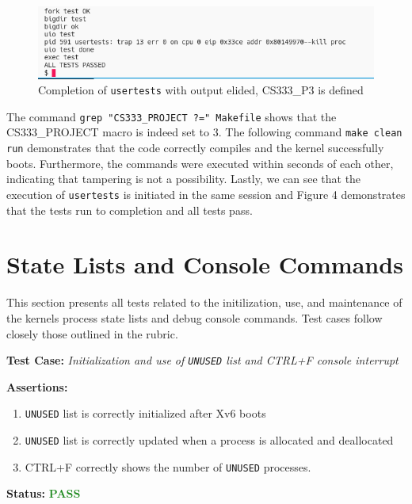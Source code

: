 \documentclass[11pt,letterpaper]{report}
\newcommand{\code}[1]{\colorbox{codegray}{\texttt{#1}}}
\begin{document}
{  \begin{figure}[h!]
	\centering
	\includegraphics[width=1\linewidth]{compilation2-usertests2.png}
	\caption[img]{Completion of \code{usertests} with output elided, CS333\_P3 is defined}
	\label{fig:P1compileP0-1}
  \end{figure}

  The command \code{grep "CS333\_PROJECT ?=" Makefile} shows that the CS333\_PROJECT macro
  is indeed set to 3. The following command \code{make clean run} demonstrates that the code
  correctly compiles and the kernel successfully boots. Furthermore, the commands were executed
  within seconds of each other, indicating that tampering is not a possibility. Lastly, we can
  see that the execution of \code{usertests} is initiated in the same session and Figure 4
  demonstrates that the tests run to completion and all tests pass. \\

  \pagebreak

  \section*{State Lists and Console Commands}
  This section presents all tests related to the initilization, use, and maintenance
  of the kernels process state lists and debug console commands. 
  Test cases follow closely those outlined in the rubric. \hfill \break
  
  \noindent\textbf{Test Case:} \emph{Initialization and use of \code{UNUSED} list and CTRL+F console interrupt}
  
  \noindent\textbf{Assertions:}
  \begin{enumerate}[]
  \item \code{UNUSED} list is correctly initialized after Xv6 boots
  \item \code{UNUSED} list is correctly updated when a process is allocated and deallocated
  \item CTRL+F correctly shows the number of \code{UNUSED} processes.
  \end{enumerate}  
  
  \noindent\textbf{Status:} \textcolor{ForestGreen}{\textbf{PASS}}
  
}
\end{document}
